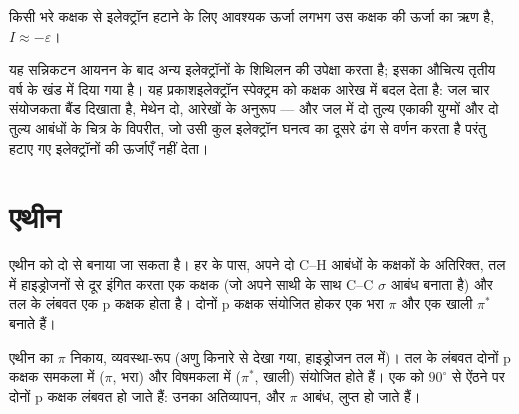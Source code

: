 \begin{proposition}[कूपमान्स सन्निकटन]\label{prop:b2:fragment-orbitals:koopmans}
किसी भरे कक्षक से इलेक्ट्रॉन हटाने के लिए आवश्यक ऊर्जा
लगभग उस कक्षक की ऊर्जा का ऋण है, $I \approx -\varepsilon$।
\end{proposition}

\admitted

यह सन्निकटन आयनन के बाद अन्य इलेक्ट्रॉनों के शिथिलन की
उपेक्षा करता है; इसका औचित्य तृतीय वर्ष के खंड में दिया गया है। यह प्रकाशइलेक्ट्रॉन
स्पेक्ट्रम को कक्षक आरेख में बदल देता है: जल चार संयोजकता बैंड दिखाता है, मेथेन दो,
 आरेखों के अनुरूप --- और जल में दो तुल्य
एकाकी युग्मों और दो तुल्य आबंधों के चित्र के विपरीत, जो उसी कुल
इलेक्ट्रॉन घनत्व का दूसरे ढंग से वर्णन करता है परंतु हटाए गए इलेक्ट्रॉनों की
ऊर्जाएँ नहीं देता।

\section{एथीन}

एथीन को दो   से बनाया जा सकता है। हर  के पास, अपने दो C--H आबंधों के
कक्षकों के अतिरिक्त, तल में हाइड्रोजनों से दूर इंगित करता एक कक्षक
(जो अपने साथी के साथ C--C $\sigma$ आबंध बनाता है) और तल के लंबवत एक p कक्षक
होता है। दोनों p कक्षक संयोजित होकर एक भरा $\pi$ और एक
खाली $\pi^*$ बनाते हैं।

\begin{omfigure}

{\small एथीन का $\pi$ निकाय, व्यवस्था-रूप (अणु किनारे से देखा गया,
हाइड्रोजन तल में)। तल के लंबवत दोनों p कक्षक समकला में
($\pi$, भरा) और विषमकला में ($\pi^*$, खाली) संयोजित होते हैं। एक  को
$90^\circ$ से ऐंठने पर दोनों p कक्षक लंबवत हो जाते हैं: उनका अतिव्यापन, और $\pi$
आबंध, लुप्त हो जाते हैं।}
\end{omfigure}

